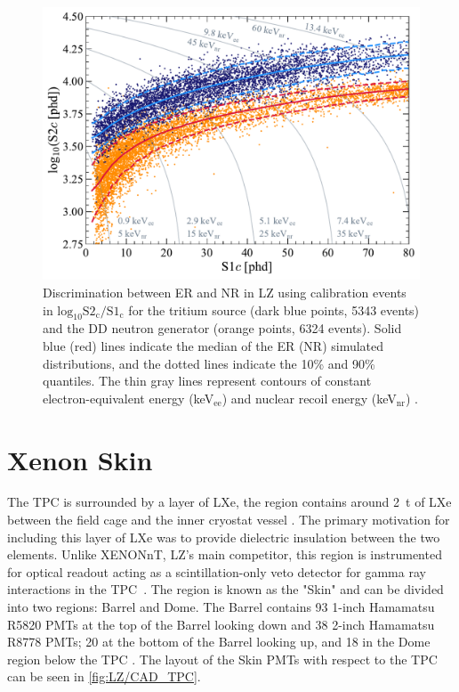 \begin{figure}[!ht]
    \centering
    \includegraphics[width=0.8\linewidth]{figures/LZ/SR1WS_calOnly_0629.pdf}
    \caption[Discrimination between ER and NR in LZ using calibration events.]{Discrimination between ER and NR in LZ using calibration events in $\text{log}_{10}\text{S2}_{\text{c}}/\text{S1}_{\text{c}}$ for the tritium source (dark blue points, 5343 events) and the DD neutron generator (orange points, 6324 events). Solid blue (red) lines indicate the median of the ER (NR) simulated distributions, and the dotted lines indicate the 10\% and 90\% quantiles. The thin gray lines represent contours of constant electron-equivalent energy (keV$_{\text{ee}}$) and nuclear recoil energy (keV$_{\text{nr}}$) \cite{LZ:2022lsv}.}
    \label{fig:LZ/NRERBandExample}
\end{figure}

\section{Xenon Skin}\label{sec:LZ/Skin}
The TPC is surrounded by a layer of LXe, the region contains around 2~t of LXe between the field cage and the inner cryostat vessel \cite{LZNIMA}. The primary motivation for including this layer of LXe was to provide dielectric insulation between the two elements. Unlike XENONnT, LZ's main competitor, this region is instrumented for optical readout acting as a scintillation-only veto detector for gamma ray interactions in the TPC~\cite{XENON:2024wpa}. The region is known as the "Skin" and can be divided into two regions: Barrel and Dome. The Barrel contains 93 1-inch Hamamatsu R5820 PMTs at the top of the Barrel looking down and 38 2-inch Hamamatsu R8778 PMTs; 20 at the bottom of the Barrel looking up, and 18 in the Dome region below the TPC \cite{LZNIMA}. The layout of the Skin PMTs with respect to the TPC can be seen in \autoref{fig:LZ/CAD_TPC}.

